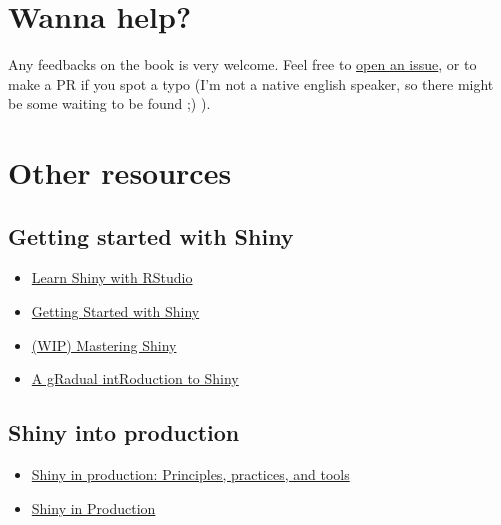 \documentclass[]{book}
\providecommand{\tightlist}{%
  \setlength{\itemsep}{0pt}\setlength{\parskip}{0pt}}
\begin{document}
\hypertarget{wanna-help}{%
\section{Wanna help?}\label{wanna-help}}

Any feedbacks on the book is very welcome. Feel free to \href{https://github.com/ThinkR-open/building-shiny-apps-workflow/issues}{open an issue}, or to make a PR if you spot a typo (I'm not a native english speaker, so there might be some waiting to be found ;) ).

\hypertarget{other-resources}{%
\section{Other resources}\label{other-resources}}

\hypertarget{getting-started-with-shiny}{%
\subsection{Getting started with Shiny}\label{getting-started-with-shiny}}

\begin{itemize}
\tightlist
\item
  \href{https://shiny.rstudio.com/tutorial/}{Learn Shiny with RStudio}
\item
  \href{https://ourcodingclub.github.io/2017/03/07/shiny.html}{Getting Started with Shiny}
\item
  \href{https://github.com/jcheng5/shiny-book}{(WIP) Mastering Shiny}
\item
  \href{https://laderast.github.io/gradual_shiny/}{A gRadual intRoduction to Shiny}
\end{itemize}

\hypertarget{shiny-into-production}{%
\subsection{Shiny into production}\label{shiny-into-production}}

\begin{itemize}
\tightlist
\item
  \href{https://resources.rstudio.com/rstudio-conf-2019/shiny-in-production-principles-practices-and-tools-joe-cheng}{Shiny in production: Principles, practices, and tools}
\item
  \href{https://kellobri.github.io/shiny-prod-book/}{Shiny in Production}
\end{itemize}
\end{document}
